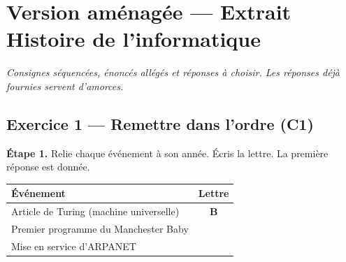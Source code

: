 \section*{Version aménagée --- Extrait Histoire de l'informatique}
\textit{Consignes séquencées, énoncés allégés et réponses à choisir.
Les réponses déjà fournies servent d'amorces.}

\bigskip

\subsection*{Exercice 1 --- Remettre dans l'ordre (C1)}

\textbf{Étape 1.} Relie chaque événement à son année. Écris la lettre.
La première réponse est donnée.

\medskip

\begin{center}
\begin{tabular}{|l|c|}
\hline
\textbf{Événement} & \textbf{Lettre} \\
\hline
Article de Turing (machine universelle) & \textbf{B} \\
\hline
Premier programme du Manchester Baby & \dotfill \\
\hline
Mise en service d'ARPANET & \dotfill \\
\hline
\end{tabular}
\end{center}

